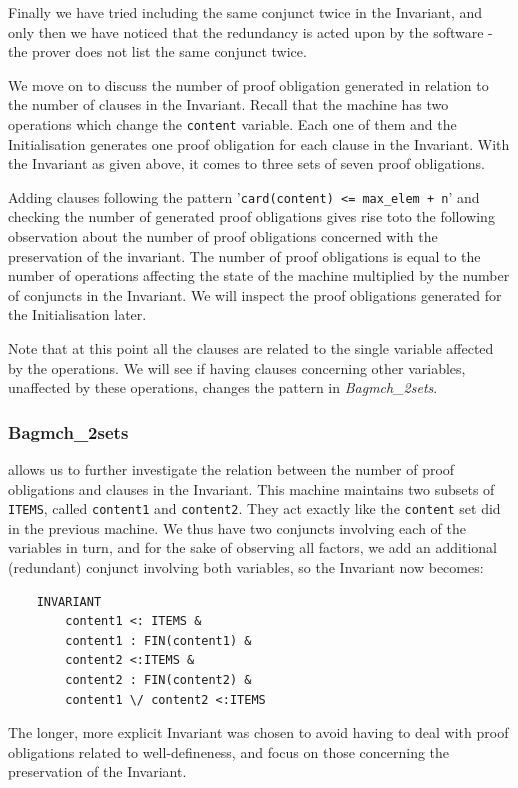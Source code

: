 \documentclass[11pt,journal]{IEEEtran}
\begin{document}
	Finally we have tried including the same conjunct twice in the Invariant, and only then we have noticed that the redundancy is acted upon by the software - the prover does not list the same conjunct twice. 
	
	We move on to discuss the number of proof obligation generated in relation to the number of clauses in the Invariant. Recall that the machine has two operations which change the \texttt{content} variable. Each one of them and the Initialisation generates one proof obligation for each clause in the Invariant. With the Invariant as given above, it comes to three sets of seven proof obligations. 
	
	Adding clauses following the pattern '\texttt{card(content) <= max\_elem + n}' and checking the number of generated proof obligations gives rise toto the following observation about the number of proof obligations concerned with the preservation of the invariant. The number of proof obligations is equal to the number of operations affecting the state of the machine multiplied by the number of conjuncts in the Invariant. We will inspect the proof obligations generated for the Initialisation later.	
	
	Note that at this point all the clauses are related to the single variable affected by the operations. We will see if having clauses concerning other variables, unaffected by these operations, changes the pattern in \emph{Bagmch\_2sets}.
	
	\subsubsection{Bagmch\_2sets} allows us to further investigate the relation between the number of proof obligations and clauses in the Invariant. This machine maintains two subsets of \texttt{ITEMS}, called \texttt{content1} and \texttt{content2}. They act exactly like the \texttt{content} set did in the previous machine. We thus have two conjuncts involving each of the variables in turn, and for the sake of observing all factors, we add an additional (redundant) conjunct involving both variables, so the Invariant now becomes:
	
	\begin{lstlisting}
	INVARIANT
		content1 <: ITEMS &
		content1 : FIN(content1) &
		content2 <:ITEMS &
		content2 : FIN(content2) &
		content1 \/ content2 <:ITEMS
	\end{lstlisting}
	The longer, more explicit Invariant was chosen to avoid having to deal with proof obligations related to well-defineness, and focus on those concerning the preservation of the Invariant.
	
\end{document}
